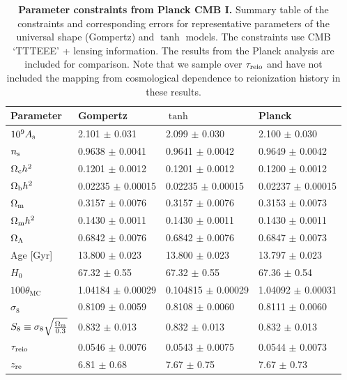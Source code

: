 \begin{table}
\centering
\small
\begin{tabular}{llll}
\toprule
Parameter & Gompertz & $\tanh$ & Planck \\
\midrule
$10^{9} A_\mathrm{s}$ & 2.101 $\pm$ 0.031 & 2.099 $\pm$ 0.030 & 2.100 $\pm$ 0.030 \\
$n_\mathrm{s}$ & 0.9638 $\pm$ 0.0041 & 0.9641 $\pm$ 0.0042 & 0.9649 $\pm$ 0.0042 \\
$\Omega_\mathrm{c} h^2$ & 0.1201 $\pm$ 0.0012 & 0.1201 $\pm$ 0.0012 & 0.1200 $\pm$ 0.0012 \\
$\Omega_\mathrm{b} h^2 $ & 0.02235 $\pm$ 0.00015 & 0.02235 $\pm$ 0.00015 & 0.02237 $\pm$ 0.00015 \\
$\Omega_\mathrm{m}$ & 0.3157 $\pm$ 0.0076 & 0.3157 $\pm$ 0.0076 & 0.3153 $\pm$ 0.0073 \\
$\Omega_\mathrm{m} h^2$ & 0.1430 $\pm$ 0.0011 & 0.1430 $\pm$ 0.0011 & 0.1430 $\pm$ 0.0011 \\
$\Omega_\Lambda$ & 0.6842 $\pm$ 0.0076 & 0.6842 $\pm$ 0.0076 & 0.6847 $\pm$ 0.0073 \\
Age [Gyr] & 13.800 $\pm$ 0.023 & 13.800 $\pm$ 0.023 & 13.797 $\pm$ 0.023 \\
$H_0$ & 67.32 $\pm$ 0.55 & 67.32 $\pm$ 0.55 & 67.36 $\pm$ 0.54 \\
$100 \theta_\mathrm{MC}$ & 1.04184 $\pm$ 0.00029 & 0.104815 $\pm$ 0.00029 & 1.04092 $\pm$ 0.00031 \\
$\sigma_8$ & 0.8109 $\pm$ 0.0059 & 0.8108 $\pm$ 0.0060 & 0.8111 $\pm$ 0.0060 \\
$S_8 \equiv \sigma_8 \sqrt{\frac{\Omega_\mathrm{m}}{0.3}}$ & 0.832 $\pm$ 0.013 & 0.832 $\pm$ 0.013 & 0.832 $\pm$ 0.013\\
$\tau_{\mathrm{reio}}$ & 0.0546 $\pm$ 0.0076 & 0.0543 $\pm$ 0.0075 & 0.0544 $\pm$ 0.0073 \\
$z_{\mathrm{re}}$ & 6.81 $\pm$ 0.68 & 7.67 $\pm$ 0.75 & 7.67 $\pm$ 0.73 \\
\bottomrule
\end{tabular}
\caption{\textbf{Parameter constraints from Planck CMB I.}
Summary table of the constraints and corresponding errors for
representative parameters of the universal shape (Gompertz) and $\tanh$
models.
The constraints use CMB `TTTEEE' + lensing information.
The results from the Planck analysis \cite{Planck2020a} are included for
comparison.
Note that we sample over $\tau_{\mathrm{reio}}$ and have not included the mapping
from cosmological dependence to reionization history in these results.}
\label{tab:tau_comp}
\end{table}

